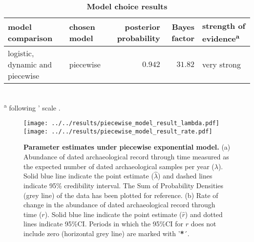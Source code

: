 \documentclass[a4paper]{article}
\begin{document}




\begin{table}[tbh]
\caption{\textbf{Model choice results}}
\label{tab:model_choice}
\small
\begin{tabularx}{0.95\textwidth}{>{\raggedright}X l r r l}
\hline
model comparison & chosen model & posterior probability & Bayes factor & strength of evidence\textsuperscript{a} \\
\hline\hline
logistic, dynamic and piecewise & piecewise & $0.942$ &  $31.82$ & very strong \\
\hline
\end{tabularx}\\
\footnotesize{\textsuperscript{a} following \citeauthor{Jeffreys1961}' scale \parencite*{Jeffreys1961}.}\\
\end{table}

\begin{figure}[tbh]
\center\texttt{[image: ../../results/piecewise\_model\_result\_lambda.pdf]}
\center\texttt{[image: ../../results/piecewise\_model\_result\_rate.pdf]}
\caption{\textbf{Parameter estimates under piecewise exponential model.} (a) Abundance of dated archaeological record through time measured as the expected number of dated archaeological samples per year ($\lambda$). Solid blue line indicate the point estimate ($\hat\lambda$) and dashed lines indicate 95\% credibility interval. The Sum of Probability Densities (grey line) of the data has been plotted for reference. (b) Rate of change in the abundance of dated archaeological record through time ($r$). Solid blue line indicate the point estimate ($\hat{r}$) and dotted lines indicate 95\%CI. Periods in which the 95\%CI for $r$ does not include zero (horizontal grey line) are marked with '\textbf{*}´.}
\label{fig:piecewise_results}
\end{figure}
\end{document}
